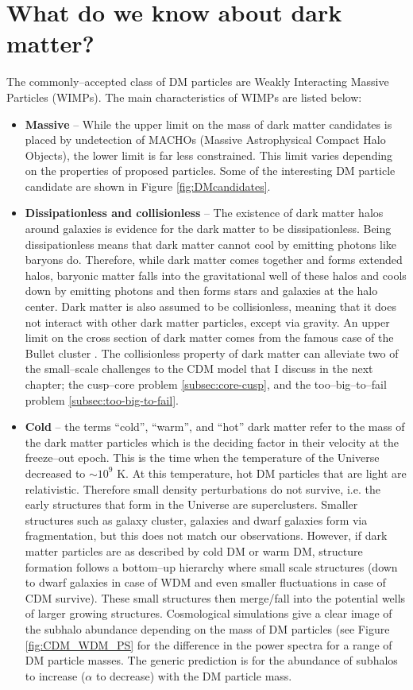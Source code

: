 \documentclass[a4wide,12pt]{book}
\begin{document}
\section{What do we know about dark matter?}
\label{subsec:current state}
The commonly--accepted class of DM particles are Weakly Interacting Massive Particles (WIMPs). The main characteristics of WIMPs are listed below:
  \begin{itemize}
  \item {\bf Massive} -- While the upper limit on the mass of dark matter candidates is placed by undetection of MACHOs (Massive Astrophysical Compact Halo Objects), the lower limit is far less constrained. This limit varies depending on the properties of proposed particles. Some of the interesting DM particle candidate are shown in Figure \ref{fig:DMcandidates}.
  \item {\bf Dissipationless and collisionless} -- The existence of dark matter halos around galaxies is evidence for the dark matter to be dissipationless. Being dissipationless means that dark matter cannot cool by emitting photons like baryons do. Therefore, while dark matter comes together and forms extended halos, baryonic matter falls into the gravitational well of these halos and cools down by emitting photons and then forms stars and galaxies at the halo center. Dark matter is also assumed to be collisionless, meaning that it does not interact with other dark matter particles, except via gravity. An upper limit on the cross section of dark matter comes from the famous case of the Bullet cluster \citep[][]{Clowe+2006}. The collisionless property of dark matter can alleviate two of the small--scale challenges to the CDM model that I discuss in the next chapter; the cusp--core problem \ref{subsec:core-cusp}, and the too--big--to--fail problem \ref{subsec:too-big-to-fail}.
  \item {\bf Cold} -- the terms ``cold'', ``warm'', and ``hot'' dark matter refer to the mass of the dark matter particles which is the deciding factor in their velocity at the freeze--out epoch. This is the time when the temperature of the Universe decreased to $\sim 10^9$ K. At this temperature, hot DM particles that are light are relativistic. Therefore small density perturbations do not survive, i.e. the early structures that form in the Universe are superclusters. Smaller structures such as galaxy cluster, galaxies and dwarf galaxies form via fragmentation, but this does not match our observations. However, if dark matter particles are as described by cold DM or warm DM, structure formation follows a bottom--up hierarchy where small scale structures (down to dwarf galaxies in case of WDM and even smaller fluctuations in case of CDM survive). These small structures then merge/fall into the potential wells of larger growing structures. Cosmological simulations give a clear image of the subhalo abundance depending on the mass of DM particles (see Figure \ref{fig:CDM_WDM_PS} for the difference in the power spectra for a range of DM particle masses. The generic prediction is for the abundance of subhalos to increase ($\alpha$ to decrease) with the DM particle mass.

\end{itemize}
\end{document}
